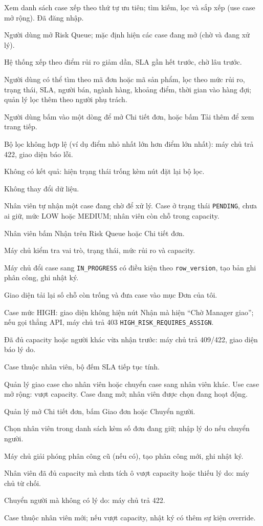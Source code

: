 {Xem danh sách case xếp theo thứ tự ưu tiên; tìm kiếm, lọc và sắp xếp (use case mở rộng).}
{Đã đăng nhập.}
{\item Người dùng mở Risk Queue; mặc định hiện các case đang mở (chờ và đang xử lý).
 \item Hệ thống xếp theo điểm rủi ro giảm dần, SLA gần hết trước, chờ lâu trước.
 \item Người dùng có thể tìm theo mã đơn hoặc mã sản phẩm, lọc theo mức rủi ro, trạng thái, SLA,
 người bán, ngành hàng, khoảng điểm, thời gian vào hàng đợi; quản lý lọc thêm theo người phụ trách.
 \item Người dùng bấm vào một dòng để mở Chi tiết đơn, hoặc bấm Tải thêm để xem trang tiếp.}
{\item Bộ lọc không hợp lệ (ví dụ điểm nhỏ nhất lớn hơn điểm lớn nhất): máy chủ trả 422, giao diện báo lỗi.
 \item Không có kết quả: hiện trạng thái trống kèm nút đặt lại bộ lọc.}
{Không thay đổi dữ liệu.}

{Nhân viên tự nhận một case đang chờ để xử lý.}
{Case ở trạng thái \texttt{PENDING}, chưa ai giữ, mức LOW hoặc MEDIUM; nhân viên còn chỗ trong capacity.}
{\item Nhân viên bấm Nhận trên Risk Queue hoặc Chi tiết đơn.
 \item Máy chủ kiểm tra vai trò, trạng thái, mức rủi ro và capacity.
 \item Máy chủ đổi case sang \texttt{IN\_PROGRESS} có điều kiện theo \texttt{row\_version}, tạo bản ghi phân công, ghi nhật ký.
 \item Giao diện tải lại số chỗ còn trống và đưa case vào mục Đơn của tôi.}
{\item Case mức HIGH: giao diện không hiện nút Nhận mà hiện ``Chờ Manager giao''; nếu gọi thẳng API, máy chủ trả 403 \texttt{HIGH\_RISK\_REQUIRES\_ASSIGN}.
 \item Đã đủ capacity hoặc người khác vừa nhận trước: máy chủ trả 409/422, giao diện báo lý do.}
{Case thuộc nhân viên, bộ đếm SLA tiếp tục tính.}

{Quản lý giao case cho nhân viên hoặc chuyển case sang nhân viên khác. Use case mở rộng: vượt capacity.}
{Case đang mở; nhân viên được chọn đang hoạt động.}
{\item Quản lý mở Chi tiết đơn, bấm Giao đơn hoặc Chuyển người.
 \item Chọn nhân viên trong danh sách kèm số đơn đang giữ; nhập lý do nếu chuyển người.
 \item Máy chủ giải phóng phân công cũ (nếu có), tạo phân công mới, ghi nhật ký.}
{\item Nhân viên đã đủ capacity mà chưa tích ô vượt capacity hoặc thiếu lý do: máy chủ từ chối.
 \item Chuyển người mà không có lý do: máy chủ trả 422.}
{Case thuộc nhân viên mới; nếu vượt capacity, nhật ký có thêm sự kiện override.}

